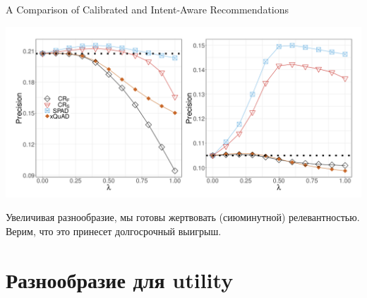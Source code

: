 \documentclass[11pt,aspectratio=169,handout]{beamer}
\begin{document}
\begin{frame}{A Comparison of Calibrated and Intent-Aware Recommendations \cite{BRIDGE}}
\begin{center}
\includegraphics[scale=0.5]{images/spad.png}
\end{center}
\end{frame}

\begin{frame}

\begin{tcolorbox}[colback=info!5,colframe=info!80,title=]
Увеличивая разнообразие, мы готовы жертвовать (сиюминутной) релевантностью. Верим, что это принесет долгосрочный выигрыш.
\end{tcolorbox}

\end{frame}

\section{Разнообразие для utility}
\end{document}
